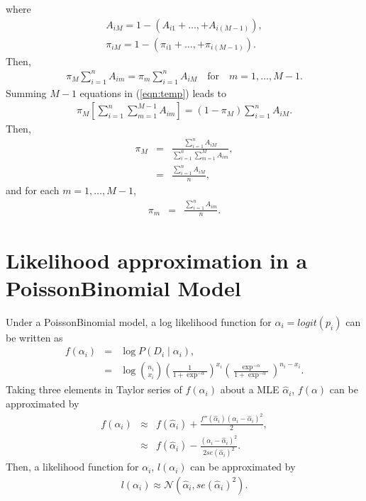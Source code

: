 \documentclass[12pt,letterpaper]{article}
\newcommand{\given}{\mid}
\newcommand{\Normal}{\mathcal{N}}
\begin{document}
where 
\begin{eqnarray}
	A_{iM} = 1 - (A_{i1} + \ldots, + A_{i(M-1)}),\\
	\pi_{iM} = 1 - (\pi_{i1} + \ldots, + \pi_{i(M-1)}).
\end{eqnarray}
Then, 
\begin{eqnarray}
\pi_M \sum_{i=1}^nA_{im} = \pi_m \sum_{i=1}^nA_{iM} \quad \text{for} \quad m = 1, \ldots, M-1. \label{eqn:temp}
\end{eqnarray}
Summing $M-1$ equations in (\ref{eqn:temp}) leads to 
\begin{eqnarray}
	\pi_M [\sum_{i=1}^n\sum_{m=1}^{M-1}A_{im}] = (1-\pi_M) \sum_{i=1}^nA_{iM}.
\end{eqnarray}
Then,
\begin{eqnarray}
	\pi_M  &=& \frac{\sum_{i=1}^nA_{iM}} {\sum_{i=1}^n\sum_{m=1}^{M}A_{im}},\\
		  &=& \frac{\sum_{i=1}^nA_{iM}}{n},
\end{eqnarray}
and for each $m= 1, \ldots, M-1$,
\begin{eqnarray}
	\pi_m  &=& \frac{\sum_{i=1}^nA_{im}}{n}.
\end{eqnarray}

\section{Likelihood approximation in a PoissonBinomial Model}
\label{sec:app_PB_like}
Under a PoissonBinomial model, a log likelihood function for $\alpha_i = logit(p_i)$ can be written as 
\begin{eqnarray}
f(\alpha_i) &=& \log{P(D_i \given \alpha_i)},\\
		&=& \log{{n_i \choose x_i} \left(\frac{1}{1+\exp^{-\alpha}}\right)^{x_i} \left(\frac{\exp^{-\alpha}}{1+\exp^{-\alpha}}\right)^{n_i - x_i}}. 
\end{eqnarray}
Taking three elements in Taylor series of $f(\alpha_i)$ about a MLE $\hat{\alpha}_i$, $f(\alpha)$ can be approximated by 
\begin{eqnarray}
f(\alpha_i) &\approx& f(\hat{\alpha}_i) + \frac{f''(\hat{\alpha}_i)(\alpha_i - \hat{\alpha}_i)^2}{2},\\
		&\approx& f(\hat{\alpha}_i) - \frac{(\alpha_i - \hat{\alpha}_i)^2}{2se(\hat{\alpha}_i)^2}.
\end{eqnarray}
Then, a likelihood function for $\alpha_i$, $l(\alpha_i)$ can be approximated by 
\begin{eqnarray}
l(\alpha_i) \approx \Normal(\hat{\alpha}_i, se(\hat{\alpha}_i)^2).
\end{eqnarray}
\end{document}
